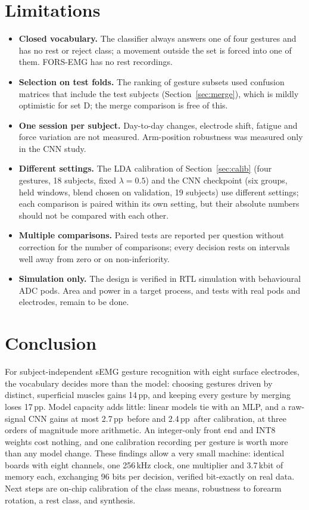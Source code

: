 \documentclass[11pt,a4paper]{article}
\newcommand{\pp}{\,pp}
\begin{document}
\section{Limitations}\label{sec:limits}
\begin{itemize}
\item \textbf{Closed vocabulary.} The classifier always answers one of four gestures and has no rest or reject
class; a movement outside the set is forced into one of them. FORS-EMG has no rest recordings.
\item \textbf{Selection on test folds.} The ranking of gesture subsets used confusion matrices that include the
test subjects (Section~\ref{sec:merge}), which is mildly optimistic for set D; the merge comparison is free of
this.
\item \textbf{One session per subject.} Day-to-day changes, electrode shift, fatigue and force variation are not
measured. Arm-position robustness was measured only in the CNN study.
\item \textbf{Different settings.} The LDA calibration of Section~\ref{sec:calib} (four gestures, 18 subjects,
fixed $\lambda=0.5$) and the CNN checkpoint (six groups, held windows, blend chosen on validation, 19
subjects) use different settings; each comparison is paired within its own setting, but their absolute numbers
should not be compared with each other.
\item \textbf{Multiple comparisons.} Paired tests are reported per question without correction for the number of
comparisons; every decision rests on intervals well away from zero or on non-inferiority.
\item \textbf{Simulation only.} The design is verified in RTL simulation with behavioural ADC pods. Area and power
in a target process, and tests with real pods and electrodes, remain to be done.
\end{itemize}

\section{Conclusion}
For subject-independent sEMG gesture recognition with eight surface electrodes, the vocabulary decides more than
the model: choosing gestures driven by distinct, superficial muscles gains 14\pp, and keeping every gesture by
merging loses 17\pp. Model capacity adds little: linear models tie with an MLP, and a raw-signal CNN gains at most
2.7\pp\ before and 2.4\pp\ after calibration, at three orders of magnitude more arithmetic. An integer-only front
end and INT8 weights cost nothing, and one calibration recording per gesture is worth more than any model change.
These findings allow a very small machine: identical boards with eight channels, one 256\,kHz clock, one
multiplier and 3.7\,kbit of memory each, exchanging 96 bits per decision, verified bit-exactly on real data. Next
steps are on-chip calibration of the class means, robustness to forearm rotation, a rest class, and synthesis.
\end{document}
